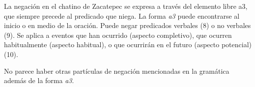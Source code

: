 La negación en el chatino de Zacatepec se expresa a través del elemento libre a3, que siempre precede al predicado que niega. La forma \textit{a3} puede encontrarse al inicio o en medio de la oración. Puede negar predicados verbales (8) o no verbales (9). Se aplica a eventos que han ocurrido (aspecto completivo), que ocurren habitualmente (aspecto habitual), o que ocurrirán en el futuro (aspecto potencial) (10).

No parece haber otras partículas de negación mencionadas en la gramática además de la forma \textit{a3}.